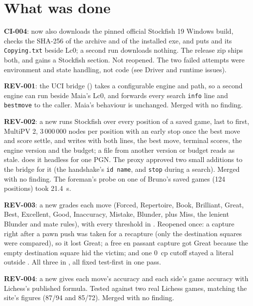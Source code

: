 \documentclass[11pt,a4paper]{article}
\begin{document}
\section*{What was done}

\textbf{CI-004}:  now also downloads the pinned official
Stockfish 19 Windows build, checks the SHA-256 of the archive and of the installed exe, and puts
 and its \texttt{Copying.txt} beside Lc0; a second run
downloads nothing. The release zip ships both, and  gains a Stockfish
section. Not reopened. The two failed attempts were environment and state handling, not code (see
Driver and runtime issues).

\textbf{REV-001}: the UCI bridge () takes a configurable engine and path, so a
second engine can run beside Maia's Lc0, and forwards every search \texttt{info} line and
\texttt{bestmove} to the caller. Maia's behaviour is unchanged. Merged with no finding.

\textbf{REV-002}: a new  runs Stockfish over every position of a saved
game, last to first, MultiPV 2, 3\,000\,000 nodes per position with an early stop once the best
move and score settle, and writes  with both lines, the best
move, terminal scores, the engine version and the budget; a file from another version or budget
reads as stale.  does it headless for one PGN. The proxy approved two
small additions to the bridge for it (the handshake's \texttt{id name}, and \texttt{stop} during a
search). Merged with no finding. The foreman's probe on one of Bruno's saved games (124
positions) took 21.4~s.

\textbf{REV-003}: a new  grades each move (Forced, Repertoire, Book,
Brilliant, Great, Best, Excellent, Good, Inaccuracy, Mistake, Blunder, plus Miss, the lenient
Blunder and mate rules), with every threshold in . Reopened once: a capture
right after a pawn push was taken for a recapture (only the destination squares were compared), so
it lost Great; a free en passant capture got Great because the empty destination square hid the
victim; and one 0~cp cutoff stayed a literal outside . All three in
, all fixed test-first in one pass.

\textbf{REV-004}: a new  gives each move's accuracy and each side's game
accuracy with Lichess's published formula. Tested against two real Lichess games, matching the
site's figures (87/94 and 85/72). Merged with no finding.
\end{document}
